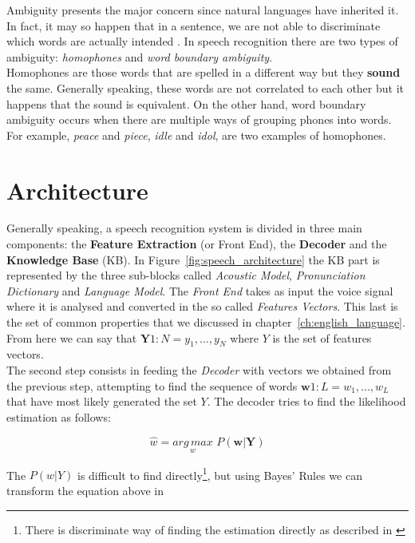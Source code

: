 \noindent Ambiguity presents the major concern since natural languages have inherited it. In fact, it may so happen that in a sentence, we are not able to discriminate which words are actually intended \cite{forsberg2003speech}. In speech recognition there are two types of ambiguity: \textit{homophones} and \textit{word boundary ambiguity}. \\
Homophones are those words that are spelled in a different way but they \textbf{sound} the same. Generally speaking, these words are not correlated to each other but it happens that the sound is equivalent. On the other hand, word boundary ambiguity occurs when there are multiple ways of grouping phones into words\cite{forsberg2003speech}. For example, \textit{peace} and \textit{piece}, \textit{idle} and \textit{idol}, are two examples of homophones.

\section{Architecture}
\label{sec:speech_rec_Architecture}
Generally speaking, a speech recognition system is divided in three main components: the \textbf{Feature Extraction} (or Front End), the \textbf{Decoder} and the \textbf{Knowledge Base} (KB). In Figure~\ref{fig:speech_architecture} the KB part is represented by the three sub-blocks called \textit{Acoustic Model}, \textit{Pronunciation Dictionary} and \textit{Language Model}. The \textit{Front End} takes as input the voice signal where it is analysed and converted in the so called \textit{Features Vectors}. This last is the set of common properties that we discussed in chapter~\ref{ch:english_language}. From here we can say that $\textbf{Y} 1:N = y_{1},..., y_{N}$ where $Y$ is the set of features vectors. \\
The second step consists in feeding the \textit{Decoder} with vectors we obtained from the previous step, attempting to find the sequence of words $\textbf{w} 1:L = w_{1}, ... , w_{L}$ that have most likely generated the set $Y$\cite{gales2008application}. The decoder tries to find the likelihood estimation as follows:

\begin{equation}
	\widehat{w} = \underset{w}{arg \, max} \,\, P(\textbf{w}| \textbf{Y})
\end{equation}

\noindent The $P (w|Y)$ is difficult to find directly\footnote{There is discriminate way of finding the estimation directly as described in \cite{gales2007discriminative}}, but using Bayes' Rules we can transform the equation above in

